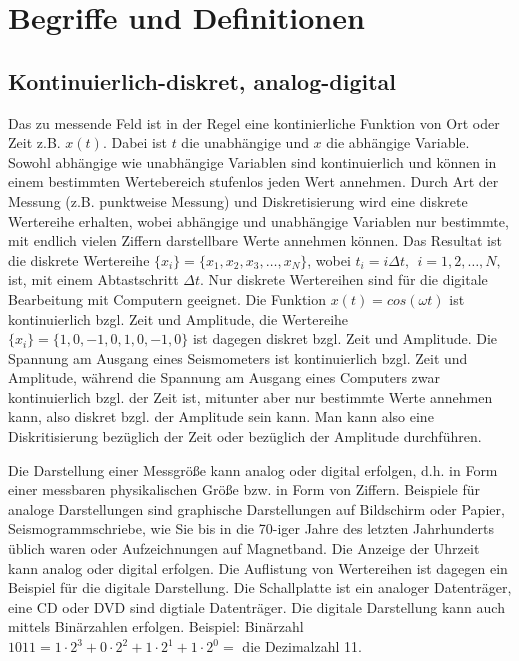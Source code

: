 \chapter{Begriffe und Definitionen}
\section{Kontinuierlich-diskret, analog-digital}
Das zu messende Feld ist in der Regel eine kontinierliche Funktion von Ort oder Zeit z.B. $x(t)$. Dabei ist $t$ die unabhängige und $x$ die abhängige Variable. Sowohl abhängige wie unabhängige Variablen sind kontinuierlich und können in einem bestimmten Wertebereich stufenlos jeden Wert annehmen. Durch Art der Messung (z.B. punktweise Messung) und Diskretisierung wird eine diskrete Wertereihe erhalten, wobei abhängige und unabhängige Variablen nur bestimmte, mit endlich vielen Ziffern darstellbare Werte annehmen können. Das Resultat ist die diskrete Wertereihe  $\{x_{i}\}=\{x_{1}, x_{2}, x_{3}, \dots, x_N\}$, wobei   $t_{i}=i\Delta t,~~ i =1,2, \dots, N,$ ist, mit einem Abtastschritt $\Delta t$. Nur diskrete Wertereihen sind für die digitale Bearbeitung mit Computern geeignet.  Die Funktion $x(t)=cos(\omega t)$ ist kontinuierlich bzgl. Zeit und Amplitude, die Wertereihe $\{ x_i \}= \{1,0,-1,0,1,0,-1,0\}$ ist dagegen diskret bzgl. Zeit und Amplitude. Die Spannung am Ausgang eines Seismometers ist kontinuierlich bzgl. Zeit und Amplitude, während die Spannung am Ausgang eines Computers zwar kontinuierlich bzgl. der Zeit ist, mitunter aber nur bestimmte Werte annehmen kann, also diskret bzgl. der Amplitude sein kann. Man kann also eine Diskritisierung bezüglich der Zeit oder bezüglich der Amplitude durchführen.     

Die Darstellung einer Messgröße kann analog oder digital erfolgen, d.h. in Form einer messbaren physikalischen Größe bzw. in Form von Ziffern. Beispiele für analoge Darstellungen sind graphische Darstellungen auf Bildschirm oder Papier, Seismogrammschriebe, wie Sie bis in die 70-iger Jahre des letzten Jahrhunderts üblich waren oder Aufzeichnungen auf Magnetband.  Die Anzeige der Uhrzeit kann analog oder digital erfolgen.  Die Auflistung von Wertereihen ist dagegen ein Beispiel für die digitale Darstellung. Die Schallplatte ist ein analoger Datenträger, eine CD oder DVD sind digtiale Datenträger. Die digitale Darstellung kann auch mittels Binärzahlen erfolgen. Beispiel: Binärzahl $1011=1\cdot 2^{3} + 0 \cdot 2^2 + 1 \cdot 2^1 + 1 \cdot 2^0 =$ die Dezimalzahl 11.

